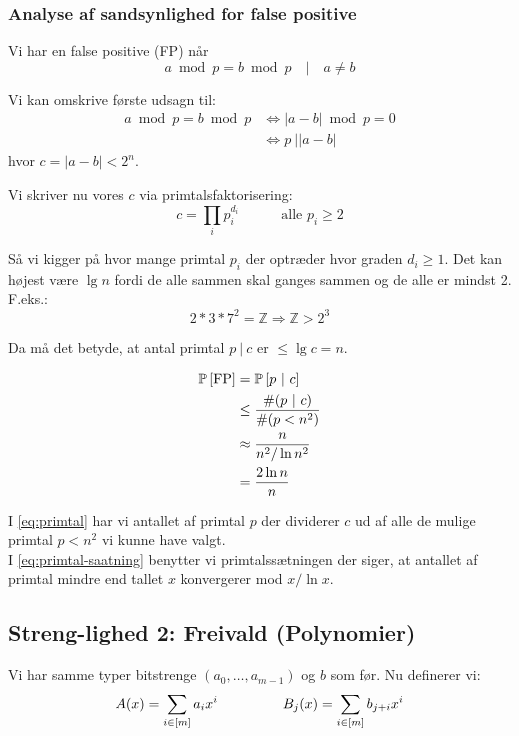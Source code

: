 \subsubsection{Analyse af sandsynlighed for false positive}
Vi har en false positive (FP) når
$$
  a \bmod p = b \bmod p \quad | \quad a \neq b
$$

Vi kan omskrive første udsagn til:
\begin{align}
  a \bmod p = b \bmod p
  &\Longleftrightarrow |a - b| \bmod p = 0\\
  &\Longleftrightarrow p \ \big| |a - b|
\end{align}
hvor $c = |a - b| < 2^n$.


Vi skriver nu vores $c$ via primtalsfaktorisering:
$$
  c = \prod_i p_i^{d_i} \quad\quad\quad \text{alle $p_i \geq 2$}
$$

Så vi kigger på hvor mange primtal $p_i$ der optræder hvor graden $d_i \geq 1$. Det kan højest være $\lg n$ fordi de alle sammen skal ganges sammen og de alle er mindst 2. F.eks.:
$$
  2 * 3 * 7^2 = \mathbb Z \Longrightarrow \mathbb Z > 2^3
$$

Da må det betyde, at antal primtal $p \ | \ c$ er $\leq \lg c = n$.

\begin{align}
  \P{\text{FP}}
  &= \P{ p \ | \ c} \nonumber \\
  &\leq \frac{\# (p \ | \ c)}{\# (p < n^2)} \label{eq:primtal} \\
  &\approx \frac{n}{n^2 / \ln n^2} \label{eq:primtal-saatning} \\
  &= \frac{2 \ln n}{n} \nonumber
\end{align}

I \cref{eq:primtal} har vi antallet af primtal $p$ der dividerer $c$ ud af alle de mulige primtal $p < n^2$  vi kunne have valgt.\\
I \cref{eq:primtal-saatning} benytter vi primtalssætningen der siger, at antallet af primtal mindre end tallet $x$ konvergerer mod $x / \ln x$.


\subsection{Streng-lighed 2: Freivald (Polynomier)}
Vi har samme typer bitstrenge $(a_0, \dots, a_{m-1})$ og $b$ som før. Nu definerer vi:
$$
  A(x) = \sum_{i \in [m]} a_i x^i
  \longspace
  B_j(x) = \sum_{i \in [m]} b_{j+i} x^i
$$

